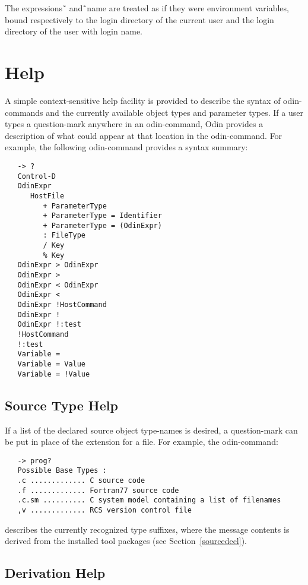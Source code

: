 The expressions {\ex \~\,} and {\ex \~\,name} are treated as if they were
environment variables, bound respectively to the login directory of the current
user and the login directory of the user with login {\ex name}.


\section{Help}
\label{help}

A simple context-sensitive help facility is provided
to describe the syntax of odin-commands
and the currently available object types and parameter types.
If a user types a question-mark anywhere in an odin-command,
Odin provides a description of what could appear at that location
in the odin-command.
For example, the following odin-command provides a syntax summary:
\begin{verbatim}
   -> ?
   Control-D
   OdinExpr
      HostFile
         + ParameterType
         + ParameterType = Identifier
         + ParameterType = (OdinExpr)
         : FileType
         / Key
         % Key
   OdinExpr > OdinExpr
   OdinExpr >
   OdinExpr < OdinExpr
   OdinExpr <
   OdinExpr !HostCommand
   OdinExpr !
   OdinExpr !:test
   !HostCommand
   !:test
   Variable =
   Variable = Value
   Variable = !Value
\end{verbatim}

\subsection{Source Type Help}

If a list of the declared source object type-names is desired,
a question-mark can be put in place of the extension for a file.
For example, the odin-command:
\begin{verbatim}
   -> prog?
   Possible Base Types :
   .c ............. C source code
   .f ............. Fortran77 source code
   .c.sm .......... C system model containing a list of filenames
   ,v ............. RCS version control file
\end{verbatim}
describes the currently recognized type suffixes,
where the message contents is derived from the installed tool packages
(see Section~\ref{sourcedecl}).

\subsection{Derivation Help}

